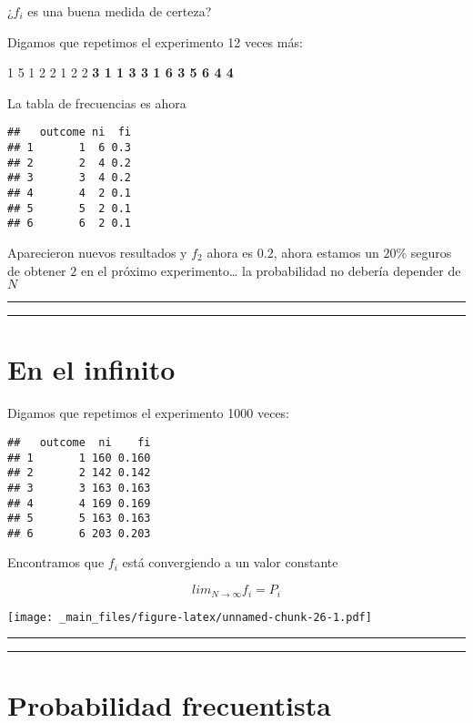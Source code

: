 \documentclass[
]{book}
\begin{document}
¿\(f_i\) es una buena medida de certeza?

Digamos que repetimos el experimento 12 veces más:

1 5 1 2 2 1 2 2 \textbf{3 1 1 3 3 1 6 3 5 6 4 4}

La tabla de frecuencias es ahora

\begin{verbatim}
##   outcome ni  fi
## 1       1  6 0.3
## 2       2  4 0.2
## 3       3  4 0.2
## 4       4  2 0.1
## 5       5  2 0.1
## 6       6  2 0.1
\end{verbatim}

Aparecieron nuevos resultados y \(f_2\) ahora es \(0.2\), ahora estamos un \(20\%\) seguros de obtener \(2\) en el próximo experimento\ldots{} la probabilidad no debería depender de \(N\)

\begin{center}\rule{0.5\linewidth}{0.5pt}\end{center}

\begin{center}\rule{0.5\linewidth}{0.5pt}\end{center}

\hypertarget{en-el-infinito}{%
\section{En el infinito}\label{en-el-infinito}}

Digamos que repetimos el experimento 1000 veces:

\begin{verbatim}
##   outcome  ni    fi
## 1       1 160 0.160
## 2       2 142 0.142
## 3       3 163 0.163
## 4       4 169 0.169
## 5       5 163 0.163
## 6       6 203 0.203
\end{verbatim}

Encontramos que \(f_i\) está convergiendo a un valor constante

\[lim_{N\rightarrow \infty} f_i = P_i\]

\texttt{[image: \_main\_files/figure-latex/unnamed-chunk-26-1.pdf]}

\begin{center}\rule{0.5\linewidth}{0.5pt}\end{center}

\begin{center}\rule{0.5\linewidth}{0.5pt}\end{center}

\hypertarget{probabilidad-frecuentista}{%
\section{Probabilidad frecuentista}\label{probabilidad-frecuentista}}
\end{document}
